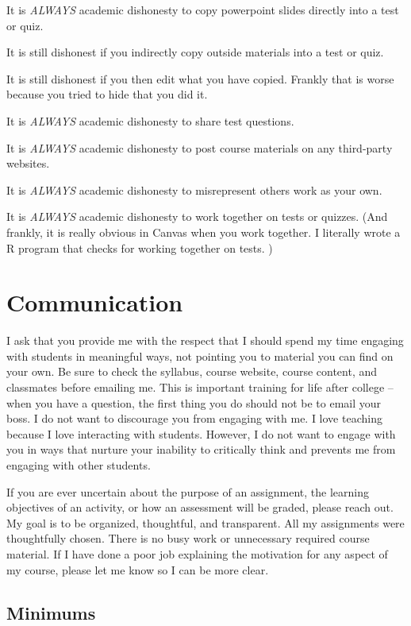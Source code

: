 \documentclass[
]{book}
\begin{document}
It is \emph{ALWAYS} academic dishonesty to copy powerpoint slides directly into a test or quiz.

It is still dishonest if you indirectly copy outside materials into a test or quiz.

It is still dishonest if you then edit what you have copied. Frankly that is worse because you tried to hide that you did it.

It is \emph{ALWAYS} academic dishonesty to share test questions.

It is \emph{ALWAYS} academic dishonesty to post course materials on any third-party websites.

It is \emph{ALWAYS} academic dishonesty to misrepresent others work as your own.

It is \emph{ALWAYS} academic dishonesty to work together on tests or quizzes.
(And frankly, it is really obvious in Canvas when you work together.
I literally wrote a R program that checks for working together on tests. )

\hypertarget{communication}{%
\chapter{Communication}\label{communication}}

I ask that you provide me with the respect that I should spend my time engaging with students in meaningful ways, not pointing you to material you can find on your own. Be sure to check the syllabus, course website, course content, and classmates before emailing me. This is important training for life after college -- when you have a question, the first thing you do should not be to email your boss. I do not want to discourage you from engaging with me. I love teaching because I love interacting with students. However, I do not want to engage with you in ways that nurture your inability to critically think and prevents me from engaging with other students.

If you are ever uncertain about the purpose of an assignment, the learning objectives of an activity, or how an assessment will be graded, please reach out. My goal is to be organized, thoughtful, and transparent. All my assignments were thoughtfully chosen. There is no busy work or unnecessary required course material. If I have done a poor job explaining the motivation for any aspect of my course, please let me know so I can be more clear.

\hypertarget{minimums}{%
\section{Minimums}\label{minimums}}
\end{document}
